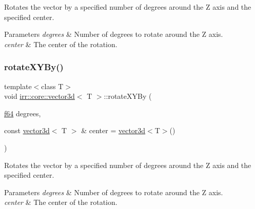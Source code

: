 Rotates the vector by a specified number of degrees around the Z axis and the specified center. 


\begin{DoxyParams}{Parameters}
{\em degrees} & Number of degrees to rotate around the Z axis. \\
\hline
{\em center} & The center of the rotation. \\
\hline
\end{DoxyParams}
\mbox{\label{classirr_1_1core_1_1vector3d_ac38b75735ec06716305fbb09ec71784d}} 
\subsubsection{\texorpdfstring{rotate\+X\+Y\+By()}{rotateXYBy()}\hspace{0.1cm}{\footnotesize\ttfamily [2/2]}}
{\footnotesize\ttfamily template$<$class T$>$ \\
void \hyperlink{classirr_1_1core_1_1vector3d}{irr\+::core\+::vector3d}$<$ T $>$\+::rotate\+X\+Y\+By (\begin{DoxyParamCaption}\item[{\hyperlink{namespaceirr_a1325b02603ad449f92c68fc640af9b28}{f64}}]{degrees,  }\item[{const \hyperlink{classirr_1_1core_1_1vector3d}{vector3d}$<$ T $>$ \&}]{center = {\ttfamily \hyperlink{classirr_1_1core_1_1vector3d}{vector3d}$<$T$>$()} }\end{DoxyParamCaption})\hspace{0.3cm}{\ttfamily [inline]}}



Rotates the vector by a specified number of degrees around the Z axis and the specified center. 


\begin{DoxyParams}{Parameters}
{\em degrees} & Number of degrees to rotate around the Z axis. \\
\hline
{\em center} & The center of the rotation. \\
\hline
\end{DoxyParams}
\mbox{\label{classirr_1_1core_1_1vector3d_a621fbddb42814edd3d14410252cf7b7a}} 
